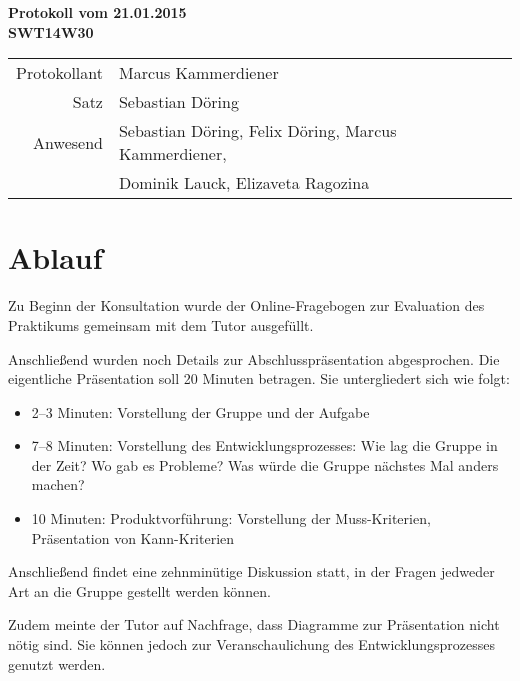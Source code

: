 \documentclass{scrartcl}
\begin{document}
\begin{center}
\LARGE \bf{Protokoll vom 21.01.2015 \\
SWT14W30}
\end{center}

\begin{tabular}{rp{10cm}}
Protokollant & Marcus Kammerdiener \\
Satz & Sebastian Döring \\
Anwesend & Sebastian Döring, Felix Döring, Marcus Kammerdiener,\\
& Dominik Lauck, Elizaveta Ragozina \\
\end{tabular}

\vspace*{3em}

\section{Ablauf}
Zu Beginn der Konsultation wurde der Online-Fragebogen zur Evaluation des Praktikums gemeinsam mit dem Tutor ausgefüllt.

Anschließend wurden noch Details zur Abschlusspräsentation abgesprochen.
Die eigentliche Präsentation soll 20 Minuten betragen. Sie untergliedert sich wie folgt:
\begin{itemize}
\item 2--3 Minuten: Vorstellung der Gruppe und der Aufgabe
\item 7--8 Minuten: Vorstellung des Entwicklungsprozesses: Wie lag die Gruppe in der Zeit? Wo gab es Probleme? Was würde die Gruppe nächstes Mal anders machen?
\item 10 Minuten: Produktvorführung: Vorstellung der Muss-Kriterien, Präsentation von Kann-Kriterien
\end{itemize}
Anschließend findet eine zehnminütige Diskussion statt, in der Fragen jedweder Art an die Gruppe gestellt werden können.

Zudem meinte der Tutor auf Nachfrage, dass Diagramme zur Präsentation nicht nötig sind. Sie können jedoch zur Veranschaulichung des Entwicklungsprozesses genutzt werden.
\end{document}
